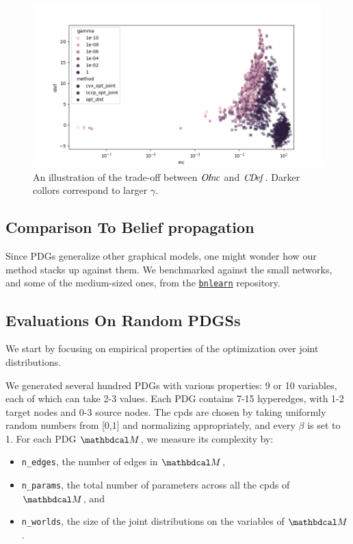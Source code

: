 \documentclass{article}
\begin{document}
\begin{figure}
    \includegraphics[width=\linewidth]{figs/inc-idef2}
    \caption{An illustration of the trade-off between $\mathit{O\mskip-2.5muI\mskip-3.5mun\mskip-1.7muc}$ and $\mathit{C\mskip-3.5muD\mskip-2.5mue\mskip-1.5muf}_{}$. Darker collors correspond to larger $\gamma$.}\label{fig:inc-idef}
\end{figure}

\subsection{Comparison To Belief propagation}

Since PDGs generalize other graphical models, one might wonder how our method stacks up against them.
We benchmarked against the small networks, and some of the medium-sized ones, from the \href{https://www.bnlearn.com/bnrepository/}{\texttt{bnlearn}} repository.



\subsection{Evaluations On Random PDGSs}
We start by focusing on empirical properties of the optimization over joint distributions.

We generated several hundred PDGs with various properties: 9 or 10 variables, each of which can take 2-3 values. Each PDG contains 7-15 hyperedges, with 1-2 target nodes and 0-3 source nodes. The cpds are chosen by taking uniformly random numbers from [0,1] and normalizing appropriately, and every $\beta$ is set to 1.
For each PDG $\dg M$, we measure its complexity by:
\begin{itemize}[nosep]
    \item \texttt{n\_edges}, the number of edges in $\dg M$,
    \item \texttt{n\_params}, the total number of parameters across all the cpds of $\dg M$, and
    \item \texttt{n\_worlds}, the size of the joint distributions on the variables of $\dg M$.
\end{itemize}
\end{document}
